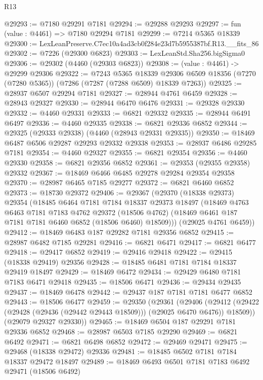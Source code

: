 \begin{lexlean}{R13}
\begin{coremodule}
@29293 := @7180 @29291 @7181
@29294 := @29288 @29293
@29297 := fun (value : @4461) => @7180 @29294 @7181
@29299 := @7214 @5365 @18339
@29300 := LexLeanPreserve.C7ec10a4ad3cb0f284e23d7b5955387bf.R13.__fits_86
@29302 := @7226 (@29300 @6823)
@29303 := LexLeanStd.Sha256.bigSigma0
@29306 := @29302 (@4460 (@29303 @6823))
@29308 := (value : @4461) -> @29299 @29306
@29322 := @7243
    @5365
    @18339
    @29306
    @6509
    @18356
    (@7270 (@7280 @5365))
    (@7286 (@7287 (@7288 @6509) @18339 @7263))
@29325 := @28937 @6507 @29294 @7181
@29327 := @28944 @4761 @6459
@29328 := @28943 @29327
@29330 := @28944 @6470 @6476
@29331 := @29328 @29330
@29332 := @4460 @29331
@29333 := @6821 @29332
@29335 := @28944 @6491 @6497
@29336 := @4460 @29335
@29338 := @6821 @29336 @6852
@29344 := @29325 (@29333 @29338) (@4460 (@28943 @29331 @29335))
@29350 := @18469 @6487 @6506 @29287 @29293 @29332 @29338
@29353 := @28937 @6486 @29285 @7181
@29354 := @4460 @29327
@29355 := @6821 @29354
@29356 := @4460 @29330
@29358 := @6821 @29356 @6852
@29361 := @29353 (@29355 @29358) @29332
@29367 := @18469 @6466 @6485 @29278 @29284 @29354 @29358
@29370 := @28987 @6465 @7185 @29277
@29372 := @6821 @6460 @6852
@29373 := @18730 @29372
@29406 := @29367
    (@29370
      (@18338 @29373)
      @29354
      (@18485
        @6464
        @7181
        @7184
        @18337
        @29373
        @18497
        (@18469
          @4763
          @6463
          @7181
          @7183
          @4762
          @29372
          (@18506 @4762)
          (@18469 @6461 @187 @7181 @7181 @6460 @6852 (@18506 @6460) @18509)))
      (@29025 @4761 @6459))
@29412 := @18469 @6483 @187 @29282 @7181 @29356 @6852
@29415 := @28987 @6482 @7185 @29281
@29416 := @6821 @6471
@29417 := @6821 @6477
@29418 := @29417 @6852
@29419 := @29416 @29418
@29422 := @29415 (@18338 @29419) @29356
@29428 := @18485 @6481 @7181 @7184 @18337 @29419 @18497
@29429 := @18469 @6472
@29434 := @29429 @6480 @7181 @7183 @6471 @29418
@29435 := @18506 @6471
@29436 := @29434 @29435
@29437 := @18469 @6478
@29442 := @29437 @187 @7181 @7181 @6477 @6852
@29443 := @18506 @6477
@29459 := @29350
    (@29361
      (@29406
        (@29412 (@29422 (@29428 (@29436 (@29442 @29443 @18509))) (@29025 @6470 @6476)) @18509))
      (@29079 @29327 @29330))
@29465 := @18469 @6504 @187 @29291 @7181 @29336 @6852
@29468 := @28987 @6503 @7185 @29290
@29469 := @6821 @6492
@29471 := @6821 @6498 @6852
@29472 := @29469 @29471
@29475 := @29468 (@18338 @29472) @29336
@29481 := @18485 @6502 @7181 @7184 @18337 @29472 @18497
@29489 := @18469 @6493 @6501 @7181 @7183 @6492 @29471 (@18506 @6492)

\end{coremodule}
\end{lexlean}
